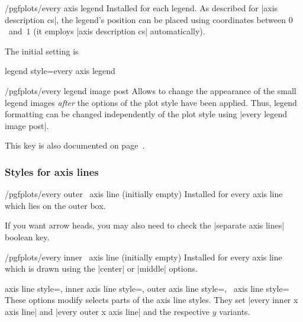 \begin{stylekey}{/pgfplots/every axis legend}
 Installed for each legend. As described for |axis description cs|, the legend's position can be placed using coordinates between $0$~and~$1$ (it employs |axis description cs| automatically).

 The initial setting is
\begin{codeexample}
\end{codeexample}
\end{stylekey}

\pgfplotsshortstylekey legend style=every axis legend\pgfeov

\begin{stylekey}{/pgfplots/every legend image post}
	Allows to change the appearance of the small legend images \emph{after} the options of the plot style have been applied. Thus, legend formatting can be changed independently of the plot style using |every legend image post|.

	This key is also documented on page~\pageref{key:legendimagepost}.
\end{stylekey}

\subsubsection*{Styles for axis lines}
\begin{xystylekey}{/pgfplots/every outer \x\ axis line (initially empty)}
	Installed for every axis line which lies on the outer box.

	If you want arrow heads, you may also need to check the |separate axis lines| boolean key.
\end{xystylekey}

\begin{xystylekey}{/pgfplots/every inner \x\ axis line (initially empty)}
	Installed for every axis line which is drawn using the |center| or |middle| options.
\end{xystylekey}

\begin{pgfplotsxykeylist}{%
	axis line style=,
	inner axis line style=,
	outer axis line style=,
	\x\ axis line style=}
	These options modify selects parts of the axis line styles. They set |every inner x axis line| and |every outer x axis line| and the respective $y$ variants.
\end{pgfplotsxykeylist}

